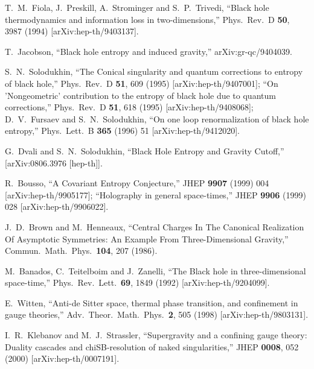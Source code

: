 \documentclass[12pt]{article}
\begin{document}
\begin{thebibliography}{99}
  T.~M.~Fiola, J.~Preskill, A.~Strominger and S.~P.~Trivedi,
  ``Black hole thermodynamics and information loss in two-dimensions,''
  Phys.\ Rev.\ D {\bf 50}, 3987 (1994)
  [arXiv:hep-th/9403137].



  T.~Jacobson,
  ``Black hole entropy and induced gravity,''
  arXiv:gr-qc/9404039.


  S.~N.~Solodukhin,
  ``The Conical singularity and quantum corrections to entropy of black hole,''
  Phys.\ Rev.\ D {\bf 51}, 609 (1995)
  [arXiv:hep-th/9407001];
  ``On 'Nongeometric' contribution to the entropy of black hole due to quantum
  corrections,''
  Phys.\ Rev.\ D {\bf 51}, 618 (1995)
  [arXiv:hep-th/9408068];
D.~V.~Fursaev and S.~N.~Solodukhin,
  ``On one loop renormalization of black hole entropy,''
  Phys.\ Lett.\  B {\bf 365} (1996) 51
  [arXiv:hep-th/9412020].




  G.~Dvali and S.~N.~Solodukhin,
  ``Black Hole Entropy and Gravity Cutoff,''
  [arXiv:0806.3976 [hep-th]].


R.~Bousso,
  ``A Covariant Entropy Conjecture,''
  JHEP {\bf 9907} (1999) 004
  [arXiv:hep-th/9905177];
  ``Holography in general space-times,''
  JHEP {\bf 9906} (1999) 028
  [arXiv:hep-th/9906022].


  J.~D.~Brown and M.~Henneaux,
  ``Central Charges In The Canonical Realization Of
  Asymptotic Symmetries: An
  Example From Three-Dimensional Gravity,''
  Commun.\ Math.\ Phys.\  {\bf 104}, 207 (1986).


 M.~Banados, C.~Teitelboim and J.~Zanelli,
  ``The Black hole in three-dimensional space-time,''
  Phys.\ Rev.\ Lett.\  {\bf 69}, 1849 (1992)
  [arXiv:hep-th/9204099].



   E.~Witten,
  ``Anti-de Sitter space, thermal phase transition, and
  confinement in  gauge
  theories,''
  Adv.\ Theor.\ Math.\ Phys.\  {\bf 2}, 505 (1998)
  [arXiv:hep-th/9803131].


 I.~R.~Klebanov and M.~J.~Strassler,
 ``Supergravity and a confining gauge theory: Duality cascades and
  chiSB-resolution of naked singularities,''
  JHEP {\bf 0008}, 052 (2000)
  [arXiv:hep-th/0007191].



\end{thebibliography}
\end{document}
